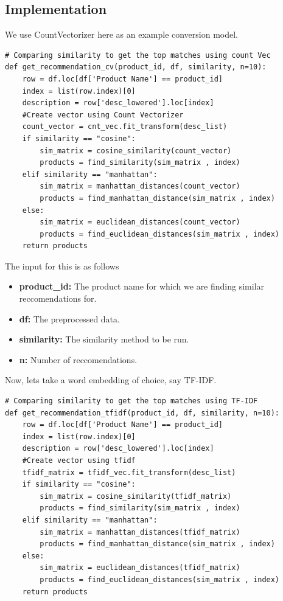 \documentclass{article}
\begin{document}
\subsection{Implementation}

We use CountVectorizer here as an example conversion model.

\begin{lstlisting}
# Comparing similarity to get the top matches using count Vec
def get_recommendation_cv(product_id, df, similarity, n=10):
    row = df.loc[df['Product Name'] == product_id]
    index = list(row.index)[0]
    description = row['desc_lowered'].loc[index]
    #Create vector using Count Vectorizer
    count_vector = cnt_vec.fit_transform(desc_list)
    if similarity == "cosine":
        sim_matrix = cosine_similarity(count_vector)
        products = find_similarity(sim_matrix , index)
    elif similarity == "manhattan":
        sim_matrix = manhattan_distances(count_vector)
        products = find_manhattan_distance(sim_matrix , index)
    else:
        sim_matrix = euclidean_distances(count_vector)
        products = find_euclidean_distances(sim_matrix , index)
    return products
\end{lstlisting}

The input for this is as follows

\begin{itemize}
    \item{\textbf{product\_id:} The product name for which we are finding similar reccomendations for.}
    \item{\textbf{df:} The preprocessed data.}
    \item{\textbf{similarity:} The similarity method to be run.}
    \item{\textbf{n:} Number of reccomendations.}
\end{itemize}

Now, lets take a word embedding of choice, say TF-IDF.

\begin{lstlisting}
# Comparing similarity to get the top matches using TF-IDF
def get_recommendation_tfidf(product_id, df, similarity, n=10):
    row = df.loc[df['Product Name'] == product_id]
    index = list(row.index)[0]
    description = row['desc_lowered'].loc[index]
    #Create vector using tfidf
    tfidf_matrix = tfidf_vec.fit_transform(desc_list)
    if similarity == "cosine":
        sim_matrix = cosine_similarity(tfidf_matrix)
        products = find_similarity(sim_matrix , index)
    elif similarity == "manhattan":
        sim_matrix = manhattan_distances(tfidf_matrix)
        products = find_manhattan_distance(sim_matrix , index)
    else:
        sim_matrix = euclidean_distances(tfidf_matrix)
        products = find_euclidean_distances(sim_matrix , index)
    return products
\end{lstlisting}
\end{document}
